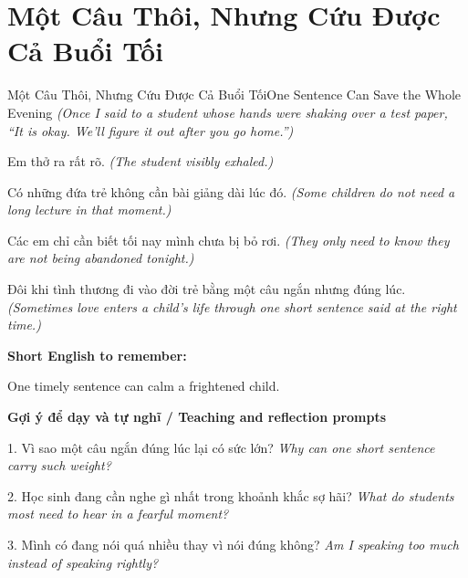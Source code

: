 \section{Một Câu Thôi, Nhưng Cứu Được Cả Buổi Tối}
\begin{truyen}{Một Câu Thôi, Nhưng Cứu Được Cả Buổi Tối}{One Sentence Can Save the Whole Evening}
\textit{(Once I said to a student whose hands were shaking over a test paper, “It is okay. We'll figure it out after you go home.”)}

Em thở ra rất rõ.
\textit{(The student visibly exhaled.)}

Có những đứa trẻ không cần bài giảng dài lúc đó.
\textit{(Some children do not need a long lecture in that moment.)}

Các em chỉ cần biết tối nay mình chưa bị bỏ rơi.
\textit{(They only need to know they are not being abandoned tonight.)}

\end{truyen}

\begin{baihoc}
Đôi khi tình thương đi vào đời trẻ bằng một câu ngắn nhưng đúng lúc.
\textit{(Sometimes love enters a child's life through one short sentence said at the right time.)}
\end{baihoc}

\begin{ghinhoanh}
\textbf{Short English to remember:}

One timely sentence can calm a frightened child.

\end{ghinhoanh}

\begin{tuhocnhanh}
\textbf{Gợi ý để dạy và tự nghĩ / Teaching and reflection prompts}

1. Vì sao một câu ngắn đúng lúc lại có sức lớn? \textit{Why can one short sentence carry such weight?}

2. Học sinh đang cần nghe gì nhất trong khoảnh khắc sợ hãi? \textit{What do students most need to hear in a fearful moment?}

3. Mình có đang nói quá nhiều thay vì nói đúng không? \textit{Am I speaking too much instead of speaking rightly?}
\end{tuhocnhanh}
